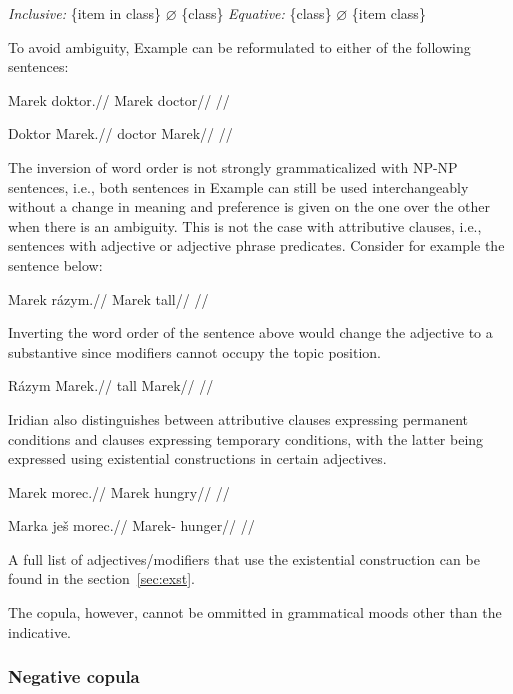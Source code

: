 \pex
\a \textit{Inclusive:} \{item in class\} $\varnothing$ \{class\}
\a \textit{Equative:} \{class\} $\varnothing$ \{item class\}
\xe

To avoid ambiguity, Example  can be reformulated to either of the following sentences:

\a
\begingl
\gla Marek doktor.//
\glb Marek doctor//
\glft {}//
\endgl

\a
\begingl
\gla Doktor Marek.//
\glb doctor Marek//
\glft {}//
\endgl

\xe

The inversion of word order is not strongly grammaticalized with NP-NP sentences, i.e., both sentences in Example  can still be used interchangeably without a change in meaning and preference is given on the one over the other when there is an ambiguity. This is not the case with attributive clauses, i.e., sentences with adjective or adjective phrase predicates. Consider for example the sentence below:

\pex
\begingl
\gla Marek rázym.//
\glb Marek tall//
\glft {}//
\endgl
\xe

Inverting the word order of the sentence above would change the adjective to a substantive since modifiers cannot occupy the topic position.

\pex
\begingl
\gla Rázym Marek.//
\glb tall Marek//
\glft {}//
\endgl
\xe

Iridian also distinguishes between attributive clauses expressing permanent conditions and clauses expressing temporary conditions, with the latter being expressed using existential constructions in certain adjectives.

\pex
\begingl
\gla *Marek morec.//
\glb Marek hungry//
\glft {}//
\endgl
\xe


\pex
\begingl
\gla Marka ješ morec.//
\glb Marek-\Acc{} \Exst{} hunger//
\glft {}//
\endgl
\xe

A full list of adjectives/modifiers that use the existential construction can be found in the section~\ref{sec:exst}.

The copula, however, cannot be ommitted in grammatical moods other than the indicative.

\subsubsection{Negative copula}

